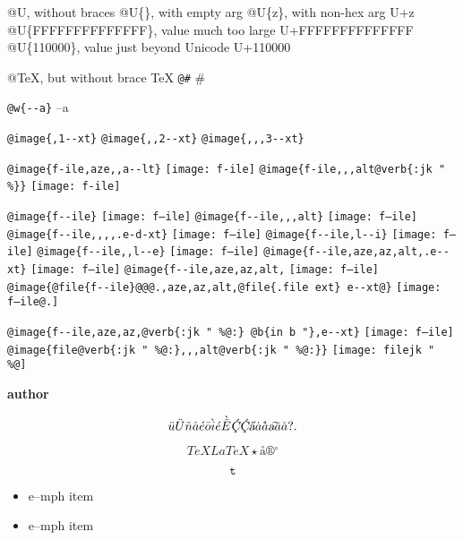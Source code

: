 \documentclass{book}
\renewcommand{\_}{\Texinfounderscore\discretionary{}{}{}}
\renewcommand{\includegraphics}[1]{\fbox{FIG \detokenize{#1}}}
\begin{document}
@U, without braces @U\{\}, with empty arg 
@U\{z\}, with non-hex arg U+z
@U\{FFFFFFFFFFFFFF\}, value much too large U+FFFFFFFFFFFFFF
@U\{110000\}, value just beyond Unicode U+110000

@TeX, but without brace \TeX{}
\texttt{@\#} \#

\texttt{@w\{{-}{-}a\}} \hbox{--a}

\texttt{@image\{,1{-}{-}xt\}} 
\texttt{@image\{{,}{,}2{-}{-}xt\}} 
\texttt{@image\{{,}{,},3{-}{-}xt\}} 

\texttt{@image\{f-ile,aze{,}{,}a{-}{-}lt\}} \texttt{[image: f-ile]}
\texttt{@image\{f-ile{,}{,},alt@verb\{:jk \_" \%\@\}\}} \texttt{[image: f-ile]}

\texttt{@image\{f{-}{-}ile\}} \texttt{[image: f--ile]}
\texttt{@image\{f{-}{-}ile{,}{,},alt\}} \texttt{[image: f--ile]}
\texttt{@image\{f{-}{-}ile{,}{,}{,}{,}.e-d-xt\}} \texttt{[image: f--ile]}
\texttt{@image\{f{-}{-}ile,l{-}{-}i\}} \texttt{[image: f--ile]}
\texttt{@image\{f{-}{-}ile{,}{,}l{-}{-}e\}} \texttt{[image: f--ile]}
\texttt{@image\{f{-}{-}ile,aze,az,alt,.e{-}{-}xt\}} \texttt{[image: f--ile]}
\texttt{@image\{f{-}{-}ile,aze,az,alt,} \texttt{[image: f--ile]}
\texttt{@image\{@file\{f{-}{-}ile\}@@@.,aze,az,alt,@file\{.file ext\}\ e{-}{-}xt@\}} \texttt{[image: f--ile@.]}

\texttt{@image\{f{-}{-}ile,aze,az,@verb\{:jk \_" \%@:\}\ @b\{in b "\},e{-}{-}xt\}} \texttt{[image: f--ile]}
\texttt{@image\{file@verb\{:jk \_" \%@:\}{,}{,},alt@verb\{:jk \_" \%@:\}\}} \texttt{[image: filejk \_" \\\%@]}


{\bfseries author}%

\[
\ddot{u} \ddot{U} \tilde{n} \hat{a} \acute{e} \bar{o} \grave{i} \acute{e} \grave{\bar{E}}
\textsl{\c{\'{C}}} \textsl{\c{\'{C}}} \textsl{\H{a}} \dot{a} \mathring{a} \textsl{\t{a}}
\breve{a} \check{a}
 ? .
\]

\[
TeX LaTeX \star{} \mathord{\text{\aa{}}} \circledR{} ^{\circ{}} 
\]

\[
\mathtt{t} 
\]

\begin{itemize}[label=\emph{}]
\item e--mph item
\end{itemize}

\begin{itemize}[label=\emph{} after emph]
\item e--mph item
\end{itemize}
\end{document}
